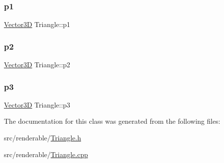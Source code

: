 \subsubsection{\texorpdfstring{p1}{p1}}
{\footnotesize\ttfamily \mbox{\hyperlink{classVector3D}{Vector3D}} Triangle\+::p1\hspace{0.3cm}{\ttfamily [private]}}

\mbox{\label{classTriangle_aa15acbc4f123f3e9e75e574566c2679a}} 
\subsubsection{\texorpdfstring{p2}{p2}}
{\footnotesize\ttfamily \mbox{\hyperlink{classVector3D}{Vector3D}} Triangle\+::p2\hspace{0.3cm}{\ttfamily [private]}}

\mbox{\label{classTriangle_a600c7366c1dad8996026742eb12434c6}} 
\subsubsection{\texorpdfstring{p3}{p3}}
{\footnotesize\ttfamily \mbox{\hyperlink{classVector3D}{Vector3D}} Triangle\+::p3\hspace{0.3cm}{\ttfamily [private]}}



The documentation for this class was generated from the following files\+:\begin{DoxyCompactItemize}
\item 
src/renderable/\mbox{\hyperlink{Triangle_8h}{Triangle.\+h}}\item 
src/renderable/\mbox{\hyperlink{Triangle_8cpp}{Triangle.\+cpp}}\end{DoxyCompactItemize}

